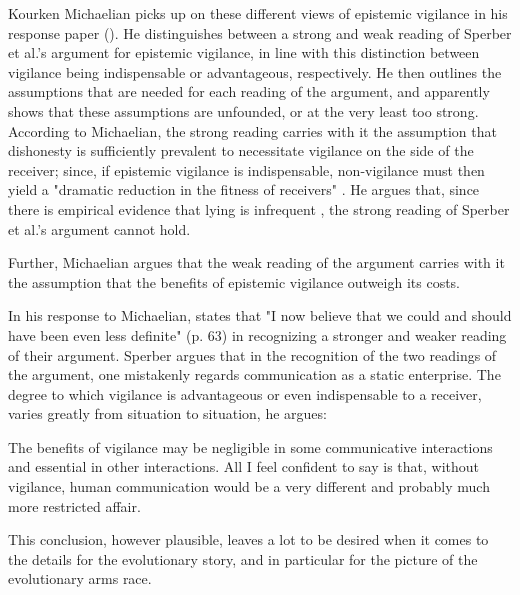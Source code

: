 Kourken Michaelian picks up on these different views of epistemic vigilance in his response paper (\citeyear{Michaelian13}). He distinguishes between a strong and weak reading of Sperber et al.'s argument for epistemic vigilance, in line with this distinction between vigilance being indispensable or advantageous, respectively.
He then outlines the assumptions that are needed for each reading of the argument, and apparently shows that these assumptions are unfounded, or at the very least too strong.
According to Michaelian, the strong reading carries with it the assumption that dishonesty is sufficiently prevalent to necessitate vigilance on the side of the receiver; since, if epistemic vigilance is indispensable, non-vigilance must then yield a "dramatic reduction in the fitness of receivers" \citep[p.~39]{Michaelian13}. He argues that, since there is empirical evidence that lying is infrequent \citep{Serota10}, the strong reading of Sperber et al.'s argument cannot hold.

Further, Michaelian argues that the weak reading of the argument carries with it the assumption that the benefits of epistemic vigilance outweigh its costs.

In his response to Michaelian, \citet{Sperber13} states that "I now believe that we could and should have been even less definite" (p. 63) in recognizing a stronger and weaker reading of their argument. Sperber argues that in the recognition of the two readings of the argument, one mistakenly regards communication as a static enterprise. The degree to which vigilance is advantageous or even indispensable to a receiver, varies greatly from situation to situation, he argues:

\begin{quoting}
    The benefits of vigilance may be negligible in some communicative interactions and essential in other interactions. All I feel confident to say is that, without vigilance, human communication would be a very different and probably much more restricted affair.
    \hfill \citep[p.~63]{Sperber13}
\end{quoting}
This conclusion, however plausible, leaves a lot to be desired when it comes to the details for the evolutionary story, and in particular for the picture of the evolutionary arms race.

